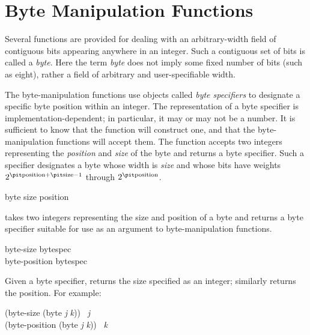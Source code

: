 \section{Byte Manipulation Functions}

Several functions are provided for dealing with an arbitrary-width field of
contiguous bits appearing anywhere in an integer.
Such a contiguous set of bits is called a {\it byte}.
Here the term {\it byte} does not imply some fixed number of bits
(such as eight), rather a field of arbitrary and user-specifiable width.

The byte-manipulation functions use objects called {\it byte specifiers} to
designate a specific byte position within an integer.
The representation of a byte specifier is implementation-dependent;
in particular, it may or may not be a number.
It is sufficient to know that the function  will construct one,
and that the byte-manipulation functions will accept them.
The function  accepts two integers representing
the {\it position} and {\it size} of the byte and returns
a byte specifier.
Such a specifier designates a byte whose width is {\it size}
and whose bits have weights $ 2^{\hbox{\scriptsize\it position}+\hbox{\scriptsize\it size}-1} $
through $ 2^{\hbox{\scriptsize\it position}} $.

\begin{defun}[Function]
byte size position

 takes two integers representing the size and position
of a byte and returns a byte specifier suitable for use
as an argument to byte-manipulation functions.
\end{defun}

\begin{defun}[Function]
byte-size bytespec \\
byte-position bytespec

Given a byte specifier,  returns the size specified as an
integer;  similarly returns the position.
For example:
\begin{lisp}
(byte-size (byte {\it j} {\it k})) \EQ\ {\it j} \\
(byte-position (byte {\it j} {\it k})) \EQ\ {\it k}
\end{lisp}
\end{defun}

